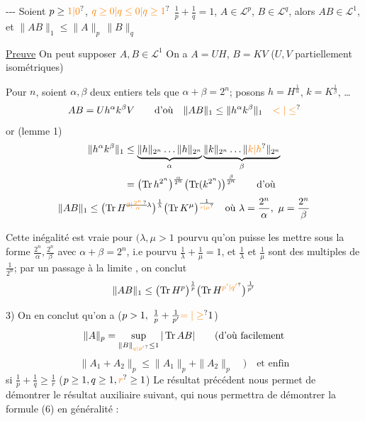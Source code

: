 \medskip\noindent\hspace*{2em}-\enspace-\enspace-
 Soient $p\geq\unsure{1|0}$,
$\unsure{q\geq0|q\leq0|q\geq1}$ \quad $\frac1p+\frac1q=1$,
$A\in\mathcal L^p$, $B\in\mathcal L^q$, alors $AB\in\mathcal L^1$, et
$\|AB\|_1\leq\|A\|_p\,\|B\|_q$

\uline{Preuve} On peut supposer $A,B\in\mathcal L^1$
On a $A=UH$, $B=KV$ ($U,V$ partiellement isométriques)

Pour  $n$, soient $\alpha,\beta$ deux entiers tels que $\alpha+\beta=2^n$;
posons $h=H^{\frac1\alpha}$, $k=K^{\frac1\beta}$, \ldots
\[
AB=Uh^\alpha k^\beta V\qquad\text{d'où}\quad\|AB\|_1\leq\|h^\alpha k^\beta\|_1\quad\unsure{<|\leq}
\]
or (lemme 1)
\[
\begin{aligned}
\|h^\alpha k^\beta\|_1&\leq
\underbrace{\|h\|_{2^n}\ldots\|h\|_{2^n}}_{\alpha}
\underbrace{\|k\|_{2^n}\ldots\|\unsure{k|h}\|_{2^n}}_{\beta}\\
&=\bigl(\operatorname{Tr} h^{2^n}\bigr)^{\frac\alpha{2^n}}
\bigl(\operatorname{Tr}(k^{2^n})\bigr)^{\frac\beta{2^n}}\qquad\text{d'où}
\end{aligned}
\]
\[
\|AB\|_1\leq\bigl(\operatorname{Tr}H^{\deleted{\unsure{2|\frac{2^n}{\alpha}}}\lambda}\bigr)^{\frac1\lambda}
\bigl(\operatorname{Tr}K^\mu\bigr)^{\frac1{\unsure{r|\mu}}}
\quad\text{où }\lambda=\frac{2^n}{\alpha},\ \mu=\frac{2^n}{\beta}
\]

Cette inégalité est vraie pour  $(\lambda,\mu>1$ pourvu qu'on puisse les mettre sous la  forme
$\frac{2^n}{\alpha},\frac{2^n}{\beta}$ avec $\alpha+\beta=2^n$,
i.e pourvu $\frac1\lambda+\frac1\mu=1$, 
et $\frac1\lambda$ et $\frac1\mu$ sont des multiples de $\frac1{2^n}$;
par un passage à la limite , on conclut
\[
\|AB\|_1\leq\bigl(\operatorname{Tr}H^p\bigr)^{\frac1p}
\bigl(\operatorname{Tr}H^{\unsure{p'|q'}}\bigr)^{\frac1{p'}}
\]

3) On en conclut qu'on a ($p>1,\ \frac1p+\frac1{p'}\unsure{=|\geq}1$)
\[
\|A\|_p=\sup_{\|B\|_{\unsure{q|p'}}\leq1}|\operatorname{Tr} AB|\qquad\text{(d'où facilement}
\]
\[
\|A_1+A_2\|_p\leq\|A_1\|_p+\|A_2\|_p\quad)\quad\text{et enfin}
\]
 si $\frac1p+\frac1q\geq\frac1r$ \quad ($p\geq1,q\geq1,\unsure{r}\geq1$)
Le résultat précédent nous permet de démontrer le résultat auxiliaire suivant, qui nous permettra de démontrer la formule (6) en  généralité :

